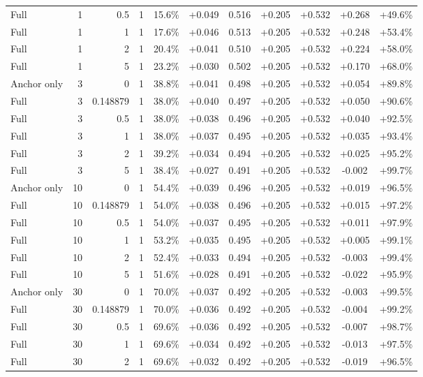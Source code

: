 \begin{table}[htbp]
\begin{tabular}{lrrrccccccc}
Full & 1 & 0.5 & 1 & 15.6\% & +0.049 & 0.516 & +0.205 & +0.532 & +0.268 & +49.6\% \\
Full & 1 & 1 & 1 & 17.6\% & +0.046 & 0.513 & +0.205 & +0.532 & +0.248 & +53.4\% \\
Full & 1 & 2 & 1 & 20.4\% & +0.041 & 0.510 & +0.205 & +0.532 & +0.224 & +58.0\% \\
Full & 1 & 5 & 1 & 23.2\% & +0.030 & 0.502 & +0.205 & +0.532 & +0.170 & +68.0\% \\
Anchor only & 3 & 0 & 1 & 38.8\% & +0.041 & 0.498 & +0.205 & +0.532 & +0.054 & +89.8\% \\
Full & 3 & 0.148879 & 1 & 38.0\% & +0.040 & 0.497 & +0.205 & +0.532 & +0.050 & +90.6\% \\
Full & 3 & 0.5 & 1 & 38.0\% & +0.038 & 0.496 & +0.205 & +0.532 & +0.040 & +92.5\% \\
Full & 3 & 1 & 1 & 38.0\% & +0.037 & 0.495 & +0.205 & +0.532 & +0.035 & +93.4\% \\
Full & 3 & 2 & 1 & 39.2\% & +0.034 & 0.494 & +0.205 & +0.532 & +0.025 & +95.2\% \\
Full & 3 & 5 & 1 & 38.4\% & +0.027 & 0.491 & +0.205 & +0.532 & -0.002 & +99.7\% \\
Anchor only & 10 & 0 & 1 & 54.4\% & +0.039 & 0.496 & +0.205 & +0.532 & +0.019 & +96.5\% \\
Full & 10 & 0.148879 & 1 & 54.0\% & +0.038 & 0.496 & +0.205 & +0.532 & +0.015 & +97.2\% \\
Full & 10 & 0.5 & 1 & 54.0\% & +0.037 & 0.495 & +0.205 & +0.532 & +0.011 & +97.9\% \\
Full & 10 & 1 & 1 & 53.2\% & +0.035 & 0.495 & +0.205 & +0.532 & +0.005 & +99.1\% \\
Full & 10 & 2 & 1 & 52.4\% & +0.033 & 0.494 & +0.205 & +0.532 & -0.003 & +99.4\% \\
Full & 10 & 5 & 1 & 51.6\% & +0.028 & 0.491 & +0.205 & +0.532 & -0.022 & +95.9\% \\
Anchor only & 30 & 0 & 1 & 70.0\% & +0.037 & 0.492 & +0.205 & +0.532 & -0.003 & +99.5\% \\
Full & 30 & 0.148879 & 1 & 70.0\% & +0.036 & 0.492 & +0.205 & +0.532 & -0.004 & +99.2\% \\
Full & 30 & 0.5 & 1 & 69.6\% & +0.036 & 0.492 & +0.205 & +0.532 & -0.007 & +98.7\% \\
Full & 30 & 1 & 1 & 69.6\% & +0.034 & 0.492 & +0.205 & +0.532 & -0.013 & +97.5\% \\
Full & 30 & 2 & 1 & 69.6\% & +0.032 & 0.492 & +0.205 & +0.532 & -0.019 & +96.5\% \\

\end{tabular}
\end{table}
